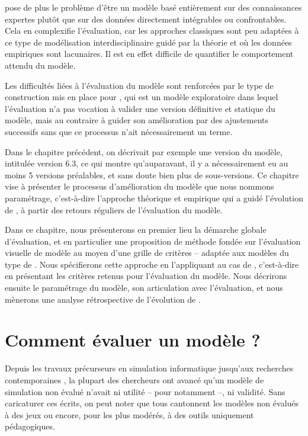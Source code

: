 \simfeodal{} pose de plus le problème d'être un modèle basé entièrement sur des connaissances expertes plutôt que sur des données directement intégrables ou confrontables.
Cela en complexifie l'évaluation, car les approches classiques sont peu adaptées à ce type de modélisation interdisciplinaire guidé par la théorie et où les données empiriques sont lacunaires.
Il est en effet difficile de quantifier le comportement attendu du modèle.

Les difficultés liées à l'évaluation du modèle sont renforcées par le type de construction mis en place pour \simfeodal{}, qui est un modèle exploratoire dans lequel l'évaluation n'a pas vocation à valider une version \og définitive\fg{} et statique du modèle, mais au contraire à guider son amélioration par des ajustements successifs sans que ce processus n'ait nécessairement un terme.

Dans le chapitre précédent, on décrivait par exemple une \og version\fg{} du modèle, intitulée \og version 6.3\fg{}, ce qui montre qu'auparavant, il y a nécessairement eu au moins 5 versions préalables, et sans doute bien plus de sous-versions.
Ce chapitre vise à présenter le processus d'amélioration du modèle que nous nommons \og paramétrage\fg{}, c'est-à-dire l'approche théorique et empirique qui a guidé l'évolution de \simfeodal{}, à partir des retours réguliers de l'évaluation du modèle.

Dans ce chapitre, nous présenterons en premier lieu la démarche globale d'évaluation, et en particulier une proposition de méthode fondée sur l'\og{}évaluation visuelle\fg{} de modèle au moyen d'une grille de critères -- adaptée aux modèles du type de \simfeodal{}.
Nous spécifierons cette approche en l'appliquant au cas de \simfeodal{}, c'est-à-dire en présentant les critères retenus pour l'évaluation du modèle.
Nous décrirons ensuite le paramétrage du modèle, son articulation avec l'évaluation, et nous mènerons une analyse rétrospective de l'évolution de \simfeodal{}.

\section{Comment évaluer un modèle ?}\label{sec:evaluer-modele}

Depuis les travaux précurseurs en simulation informatique \autocite{naylor_verification_1967,hermann_validation_1967,sargent_validation_1979} jusqu'aux recherches contemporaines \autocite{amblard_evaluation_2006,banos_pour_2013,augusiak_merging_2014, rey-coyrehourcq_plateforme_2015}, la plupart des chercheurs ont avancé qu'un modèle de simulation non évalué n'avait ni utilité -- pour \cite{naylor_verification_1967} notamment --, ni validité.
Sans caricaturer ces écrits, on peut noter que tous cantonnent les modèles non évalués à des \og jeux\fg{} ou encore, pour les plus modérés, à des outils uniquement pédagogiques.

